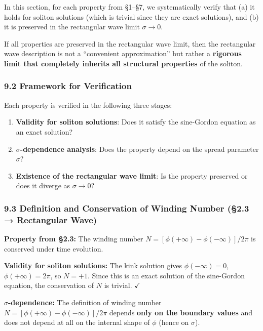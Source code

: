 \documentclass[a4paper,11pt]{article}
\providecommand{\tightlist}{\setlength{\itemsep}{0pt}\setlength{\parskip}{0pt}}
\begin{document}
In this section, for each property from §1--§7, we systematically verify
that (a) it holds for soliton solutions (which is trivial since they are
exact solutions), and (b) it is preserved in the rectangular wave limit
\(\sigma \to 0\).

If all properties are preserved in the rectangular wave limit, then the
rectangular wave description is not a ``convenient approximation'' but
rather a \textbf{rigorous limit that completely inherits all structural
properties} of the soliton.

\subsubsection{9.2 Framework for
Verification}\label{framework-for-verification}

Each property is verified in the following three stages:

\begin{enumerate}
\def\labelenumi{\arabic{enumi}.}
\tightlist
\item
  \textbf{Validity for soliton solutions}: Does it satisfy the
  sine-Gordon equation as an exact solution?
\item
  \textbf{\(\sigma\)-dependence analysis}: Does the property depend on
  the spread parameter \(\sigma\)?
\item
  \textbf{Existence of the rectangular wave limit}: Is the property
  preserved or does it diverge as \(\sigma \to 0\)?
\end{enumerate}

\subsubsection{9.3 Definition and Conservation of Winding Number (§2.3 →
Rectangular
Wave)}\label{definition-and-conservation-of-winding-number-2.3-rectangular-wave}

\textbf{Property from §2.3:} The winding number
\(N = [\phi(+\infty) - \phi(-\infty)] / 2\pi\) is conserved under time
evolution.

\textbf{Validity for soliton solutions:} The kink solution gives
\(\phi(-\infty) = 0\), \(\phi(+\infty) = 2\pi\), so \(N = +1\). Since
this is an exact solution of the sine-Gordon equation, the conservation
of \(N\) is trivial. \(\checkmark\)

\textbf{\(\sigma\)-dependence:} The definition of winding number
\(N = [\phi(+\infty) - \phi(-\infty)] / 2\pi\) depends \textbf{only on
the boundary values} and does not depend at all on the internal shape of
\(\phi\) (hence on \(\sigma\)).
\end{document}
